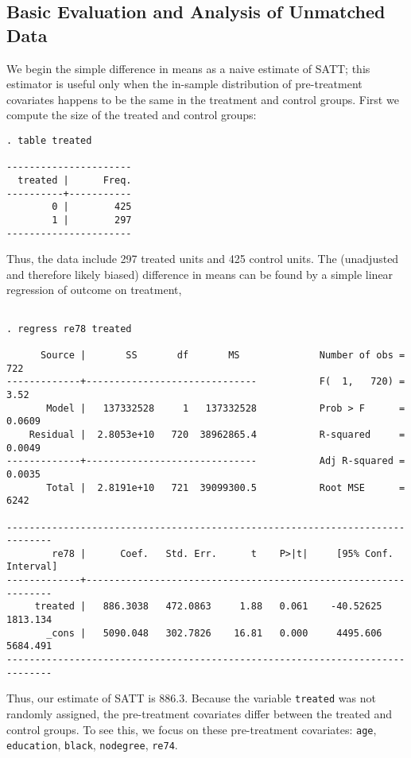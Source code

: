 \documentclass[11pt]{article}
\begin{document}
\subsection{Basic Evaluation and Analysis of Unmatched Data}\label{s:basic}

We begin the simple difference in means as a naive estimate of SATT;
this estimator is useful only when the in-sample distribution of
pre-treatment covariates happens to be the same in the treatment and
control groups. First we compute the size of the treated and control
groups:

\begin{verbatim}
. table treated

----------------------
  treated |      Freq.
----------+-----------
        0 |        425
        1 |        297
----------------------

\end{verbatim}


Thus, the data include 297 treated units and 425 control units.  The
(unadjusted and therefore likely biased) difference in means can be found
by a simple linear regression of outcome on treatment,

\begin{verbatim}

. regress re78 treated

      Source |       SS       df       MS              Number of obs =     722
-------------+------------------------------           F(  1,   720) =    3.52
       Model |   137332528     1   137332528           Prob > F      =  0.0609
    Residual |  2.8053e+10   720  38962865.4           R-squared     =  0.0049
-------------+------------------------------           Adj R-squared =  0.0035
       Total |  2.8191e+10   721  39099300.5           Root MSE      =    6242

------------------------------------------------------------------------------
        re78 |      Coef.   Std. Err.      t    P>|t|     [95% Conf. Interval]
-------------+----------------------------------------------------------------
     treated |   886.3038   472.0863     1.88   0.061    -40.52625    1813.134
       _cons |   5090.048   302.7826    16.81   0.000     4495.606    5684.491
------------------------------------------------------------------------------

\end{verbatim}


Thus, our estimate of SATT is 886.3. Because the variable \texttt{treated} was
not randomly assigned, the pre-treatment covariates differ between the
treated and control groups.  To see this, we focus on these pre-treatment
covariates: \texttt{age}, \texttt{education}, \texttt{black},
\texttt{nodegree}, \texttt{re74}.
\end{document}
